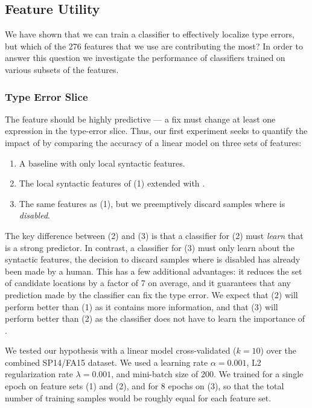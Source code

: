 \subsection{Feature Utility}
\label{sec:feature-utility}
We have shown that we can train a classifier to effectively localize
type errors, but which of the 276 features that we use are contributing
the most?
%
In order to answer this question we investigate the performance of
classifiers trained on various subsets of the features.

\subsubsection{Type Error Slice}
\label{sec:type-error-slice}
The \InSlice feature should be highly predictive --- a fix must change
at least one expression in the type-error slice.
%
Thus, our first experiment seeks to quantify the impact of \InSlice by
comparing the accuracy of a linear model on three sets of features:
%
\begin{enumerate}
\item A baseline with only local syntactic features.
\item The local syntactic features of (1) extended with \InSlice.
\item The same features as (1), but we preemptively discard samples
  where \InSlice is \emph{disabled}.
\end{enumerate}
%
The key difference between (2) and (3) is that a classifier for (2) must
\emph{learn} that \InSlice is a strong predictor.
%
In contrast, a classifier for (3) must only learn about the syntactic
features, the decision to discard samples where \InSlice is disabled has
already been made by a human.
%
This has a few additional advantages: it reduces the set of candidate
locations by a factor of 7 on average, and it guarantees that any
prediction made by the classifier can fix the type error.
%
We expect that (2) will perform better than (1) as it contains more
information, and that (3) will perform better than (2) as the classifier
does not have to learn the importance of \InSlice.

We tested our hypothesis with a linear model cross-validated ($k=10$)
over the combined SP14/FA15 dataset. We used a learning rate
$\alpha=0.001$, L2 regularization rate $\lambda=0.001$, and mini-batch
size of 200. We trained for a single epoch on feature sets (1) and
(2), and for 8 epochs on (3), so that the total number of training samples
would be roughly equal for each feature set.

